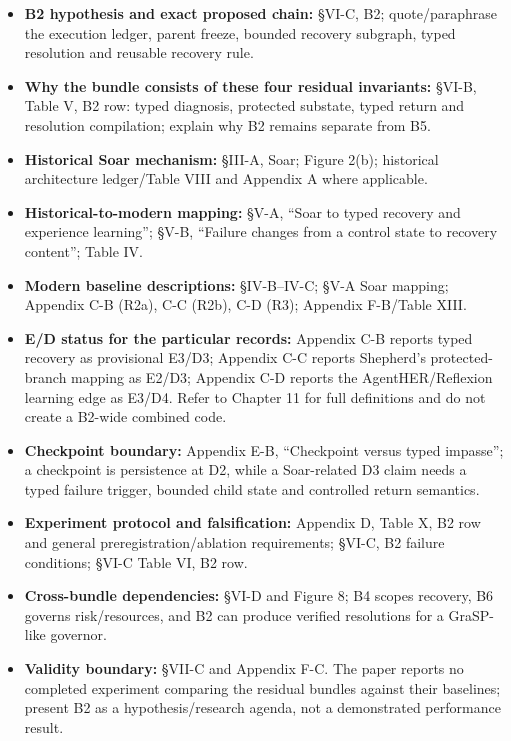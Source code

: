 \begin{itemize}
\tightlist
\item
  \textbf{B2 hypothesis and exact proposed chain:} §VI-C, B2; quote/paraphrase the execution ledger, parent freeze, bounded recovery subgraph, typed resolution and reusable recovery rule.
\item
  \textbf{Why the bundle consists of these four residual invariants:} §VI-B, Table V, B2 row: typed diagnosis, protected substate, typed return and resolution compilation; explain why B2 remains separate from B5.
\item
  \textbf{Historical Soar mechanism:} §III-A, Soar; Figure 2(b); historical architecture ledger/Table VIII and Appendix A where applicable.
\item
  \textbf{Historical-to-modern mapping:} §V-A, ``Soar to typed recovery and experience learning''; §V-B, ``Failure changes from a control state to recovery content''; Table IV.
\item
  \textbf{Modern baseline descriptions:} §IV-B--IV-C; §V-A Soar mapping; Appendix C-B (R2a), C-C (R2b), C-D (R3); Appendix F-B/Table XIII.
\item
  \textbf{E/D status for the particular records:} Appendix C-B reports typed recovery as provisional E3/D3; Appendix C-C reports Shepherd's protected-branch mapping as E2/D3; Appendix C-D reports the AgentHER/Reflexion learning edge as E3/D4. Refer to Chapter 11 for full definitions and do not create a B2-wide combined code.
\item
  \textbf{Checkpoint boundary:} Appendix E-B, ``Checkpoint versus typed impasse''; a checkpoint is persistence at D2, while a Soar-related D3 claim needs a typed failure trigger, bounded child state and controlled return semantics.
\item
  \textbf{Experiment protocol and falsification:} Appendix D, Table X, B2 row and general preregistration/ablation requirements; §VI-C, B2 failure conditions; §VI-C Table VI, B2 row.
\item
  \textbf{Cross-bundle dependencies:} §VI-D and Figure 8; B4 scopes recovery, B6 governs risk/resources, and B2 can produce verified resolutions for a GraSP-like governor.
\item
  \textbf{Validity boundary:} §VII-C and Appendix F-C. The paper reports no completed experiment comparing the residual bundles against their baselines; present B2 as a hypothesis/research agenda, not a demonstrated performance result.
\end{itemize}

